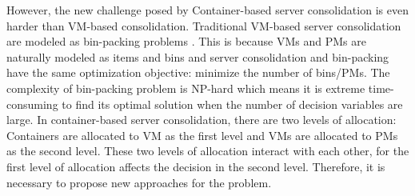 
However, the new challenge posed by Container-based server consolidation is even harder than VM-based consolidation. Traditional VM-based server consolidation are modeled as bin-packing problems \cite{Mann:2015ua}. This is because VMs and PMs are naturally modeled as items and bins and server consolidation and bin-packing have the same optimization objective: minimize the number of bins/PMs. The complexity of bin-packing problem is NP-hard which means it is extreme time-consuming to find its optimal solution when the number of decision variables are large. In container-based server consolidation, there are two levels of allocation: Containers are allocated to VM as the first level and VMs are allocated to PMs as the second level. These two levels of allocation interact with each other, for the first level of allocation affects the decision in the second level. Therefore, it is necessary to propose new approaches for the problem.

